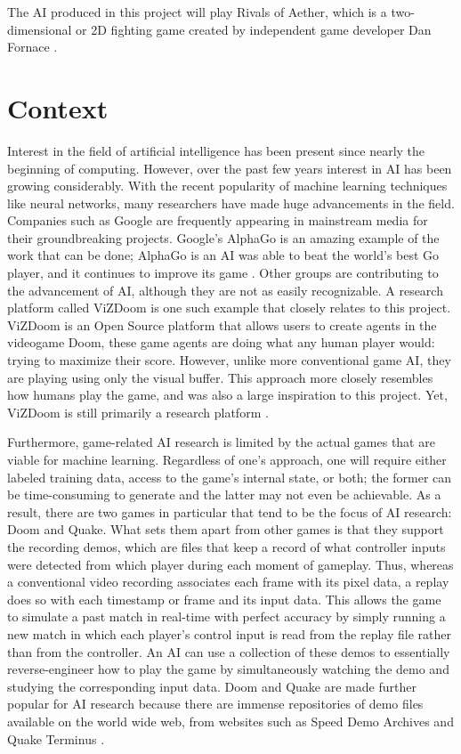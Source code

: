  The AI produced in this project will play Rivals of Aether, which is a two-dimensional or 2D fighting game created by independent game developer Dan Fornace \cite{RivalsofAether}.




\section{Context}

Interest in the field of artificial intelligence has been present since nearly the beginning of computing. However, over the past few years interest in AI has been growing considerably. With the recent popularity of machine learning techniques like neural networks, many researchers have made huge advancements in the field. Companies such as Google are frequently appearing in mainstream media for their groundbreaking projects. Google's AlphaGo is an amazing example of the work that can be done; AlphaGo is an AI was able to beat the world's best Go player, and it continues to improve its game \cite{AlphaGo}. Other groups are contributing to the advancement of AI, although they are not as easily recognizable. A research platform called ViZDoom is one such example that closely relates to this project. ViZDoom is an Open Source platform that allows users to create agents in the videogame Doom, these game agents are doing what any human player would: trying to maximize their score. However, unlike more conventional game AI, they are playing using only the visual buffer. This approach more closely resembles how humans play the game, and was also a large inspiration to this project. Yet, ViZDoom is still primarily a research platform \cite{Kempka:2016}.

Furthermore, game-related AI research is limited by the actual games that are viable for machine learning. Regardless of one's approach, one will require either labeled training data, access to the game's internal state, or both; the former can be time-consuming to generate and the latter may not even be achievable. As a result, there are two games in particular that tend to be the focus of AI research: Doom and Quake. What sets them apart from other games is that they support the recording demos, which are files that keep a record of what controller inputs were detected from which player during each moment of gameplay. Thus, whereas a conventional video recording associates each frame with its pixel data, a replay does so with each timestamp or frame and its input data. This allows the game to simulate a past match in real-time with perfect accuracy by simply running a new match in which each player's control input is read from the replay file rather than from the controller. An AI can use a collection of these demos to essentially reverse-engineer how to play the game by simultaneously watching the demo and studying the corresponding input data. Doom and Quake are made further popular for AI research because there are immense repositories of demo files available on the world wide web, from websites such as Speed Demo Archives and Quake Terminus \cite{Thurau:2004}.


